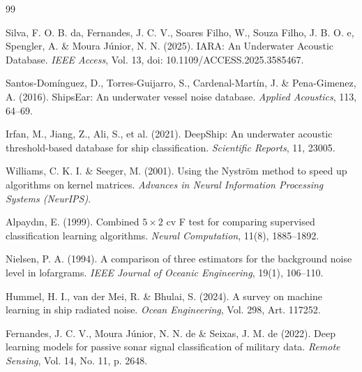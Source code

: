 \documentclass[a4paper,12pt]{article}
\begin{document}
\begin{thebibliography}{99}

Silva, F. O. B. da, Fernandes, J. C. V., Soares Filho, W., Souza Filho, J. B. O. e, Spengler, A. \& Moura Júnior, N. N. (2025). IARA: An Underwater Acoustic Database. \textit{IEEE Access}, Vol. 13, doi: 10.1109/ACCESS.2025.3585467.

Santos-Domínguez, D., Torres-Guijarro, S., Cardenal-Martín, J. \& Pena-Gimenez, A. (2016). ShipsEar: An underwater vessel noise database. \textit{Applied Acoustics}, 113, 64--69.

Irfan, M., Jiang, Z., Ali, S., et al. (2021). DeepShip: An underwater acoustic threshold-based database for ship classification. \textit{Scientific Reports}, 11, 23005.

Williams, C. K. I. \& Seeger, M. (2001). Using the Nyström method to speed up algorithms on kernel matrices. \textit{Advances in Neural Information Processing Systems (NeurIPS)}.

Alpaydın, E. (1999). Combined $5 \times 2$ cv F test for comparing supervised classification learning algorithms. \textit{Neural Computation}, 11(8), 1885--1892.

Nielsen, P. A. (1994). A comparison of three estimators for the background noise level in lofargrams. \textit{IEEE Journal of Oceanic Engineering}, 19(1), 106--110.

Hummel, H. I., van der Mei, R. \& Bhulai, S. (2024). A survey on machine learning in ship radiated noise. \textit{Ocean Engineering}, Vol. 298, Art. 117252.

Fernandes, J. C. V., Moura Júnior, N. N. de \& Seixas, J. M. de (2022). Deep learning models for passive sonar signal classification of military data. \textit{Remote Sensing}, Vol. 14, No. 11, p. 2648.

\end{thebibliography}
\end{document}

